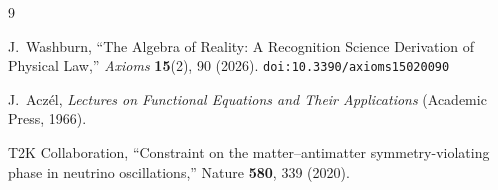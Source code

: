 \documentclass[12pt,a4paper]{article}
\theoremstyle{definition}
\theoremstyle{remark}
\begin{document}
\begin{thebibliography}{9}

J.~Washburn, ``The Algebra of Reality: A Recognition Science Derivation
of Physical Law,'' \emph{Axioms} \textbf{15}(2), 90 (2026).
\texttt{doi:10.3390/axioms15020090}

J.~Acz\'el, \emph{Lectures on Functional Equations and Their
Applications} (Academic Press, 1966).

T2K Collaboration, ``Constraint on the matter--antimatter symmetry-violating
phase in neutrino oscillations,'' Nature \textbf{580}, 339 (2020).

\end{thebibliography}
\end{document}
